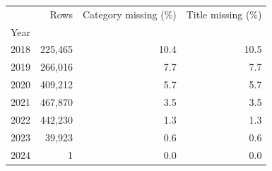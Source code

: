 \begin{tabular}{lrrr}
\toprule
 & Rows & Category missing (\%) & Title missing (\%) \\
Year &  &  &  \\
\midrule
2018 & 225,465 & 10.4 & 10.5 \\
2019 & 266,016 & 7.7 & 7.7 \\
2020 & 409,212 & 5.7 & 5.7 \\
2021 & 467,870 & 3.5 & 3.5 \\
2022 & 442,230 & 1.3 & 1.3 \\
2023 & 39,923 & 0.6 & 0.6 \\
2024 & 1 & 0.0 & 0.0 \\
\bottomrule
\end{tabular}

